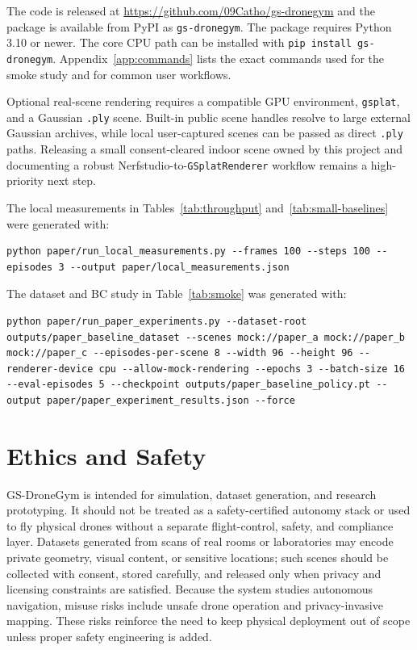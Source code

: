 \documentclass[11pt]{article}
\begin{document}
The code is released at \url{https://github.com/09Catho/gs-dronegym} and the package is available from PyPI as \texttt{gs-dronegym}. The package requires Python 3.10 or newer. The core CPU path can be installed with \texttt{pip install gs-dronegym}. Appendix~\ref{app:commands} lists the exact commands used for the smoke study and for common user workflows.

Optional real-scene rendering requires a compatible GPU environment, \texttt{gsplat}, and a Gaussian \texttt{.ply} scene. Built-in public scene handles resolve to large external Gaussian archives, while local user-captured scenes can be passed as direct \texttt{.ply} paths. Releasing a small consent-cleared indoor scene owned by this project and documenting a robust Nerfstudio-to-\texttt{GSplatRenderer} workflow remains a high-priority next step.

The local measurements in Tables~\ref{tab:throughput} and~\ref{tab:small-baselines} were generated with:
\begin{lstlisting}
python paper/run_local_measurements.py --frames 100 --steps 100 --episodes 3 --output paper/local_measurements.json
\end{lstlisting}

The dataset and BC study in Table~\ref{tab:smoke} was generated with:
\begin{lstlisting}
python paper/run_paper_experiments.py --dataset-root outputs/paper_baseline_dataset --scenes mock://paper_a mock://paper_b mock://paper_c --episodes-per-scene 8 --width 96 --height 96 --renderer-device cpu --allow-mock-rendering --epochs 3 --batch-size 16 --eval-episodes 5 --checkpoint outputs/paper_baseline_policy.pt --output paper/paper_experiment_results.json --force
\end{lstlisting}

\section{Ethics and Safety}

GS-DroneGym is intended for simulation, dataset generation, and research prototyping. It should not be treated as a safety-certified autonomy stack or used to fly physical drones without a separate flight-control, safety, and compliance layer. Datasets generated from scans of real rooms or laboratories may encode private geometry, visual content, or sensitive locations; such scenes should be collected with consent, stored carefully, and released only when privacy and licensing constraints are satisfied. Because the system studies autonomous navigation, misuse risks include unsafe drone operation and privacy-invasive mapping. These risks reinforce the need to keep physical deployment out of scope unless proper safety engineering is added.
\end{document}
